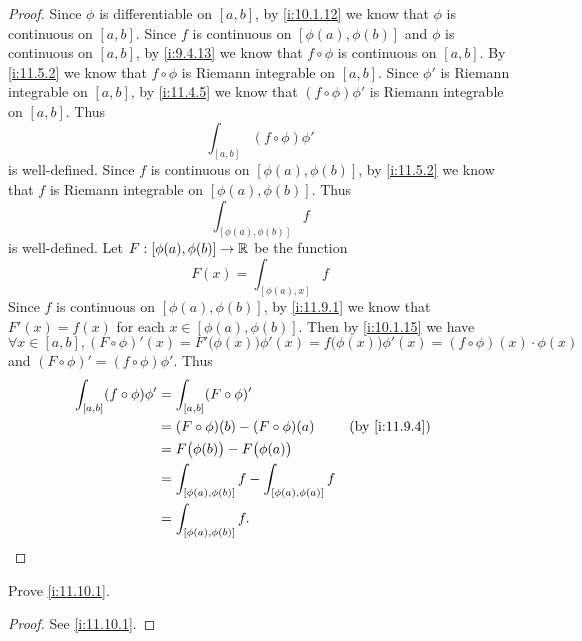 \begin{proof}
  Since \(\phi\) is differentiable on \([a, b]\), by \cref{i:10.1.12} we know that \(\phi\) is continuous on \([a, b]\).
  Since \(f\) is continuous on \([\phi(a), \phi(b)]\) and \(\phi\) is continuous on \([a, b]\), by \cref{i:9.4.13} we know that \(f \circ \phi\) is continuous on \([a, b]\).
  By \cref{i:11.5.2} we know that \(f \circ \phi\) is Riemann integrable on \([a, b]\).
  Since \(\phi'\) is Riemann integrable on \([a, b]\), by \cref{i:11.4.5} we know that \((f \circ \phi) \phi'\) is Riemann integrable on \([a, b]\).
  Thus
  \[
    \int_{[a, b]} (f \circ \phi) \phi'
  \]
  is well-defined.
  Since \(f\) is continuous on \([\phi(a), \phi(b)]\), by \cref{i:11.5.2} we know that \(f\) is Riemann integrable on \([\phi(a), \phi(b)]\).
  Thus
  \[
    \int_{[\phi(a), \phi(b)]} f
  \]
  is well-defined.
  Let \(F : [\phi(a), \phi(b)] \to \mathbb{R}\) be the function
  \[
    F(x) = \int_{[\phi(a), x]} f
  \]
  Since \(f\) is continuous on \([\phi(a), \phi(b)]\), by \cref{i:11.9.1} we know that \(F'(x) = f(x)\) for each \(x \in [\phi(a), \phi(b)]\).
  Then by \cref{i:10.1.15} we have
  \[
    \forall x \in [a, b], (F \circ \phi)'(x) = F'\big(\phi(x)\big) \phi'(x) = f\big(\phi(x)\big) \phi'(x) = (f \circ \phi)(x) \cdot \phi(x)
  \]
  and \((F \circ \phi)' = (f \circ \phi) \phi'\).
  Thus
  \begin{align*}
    \int_{[a, b]} (f \circ \phi) \phi' & = \int_{[a, b]} (F \circ \phi)'                                                \\
                                       & = (F \circ \phi)(b) - (F \circ \phi)(a)                     &  & \by{i:11.9.4} \\
                                       & = F\big(\phi(b)\big) - F\big(\phi(a)\big)                                      \\
                                       & = \int_{[\phi(a), \phi(b)]} f - \int_{[\phi(a), \phi(a)]} f                    \\
                                       & = \int_{[\phi(a), \phi(b)]} f.
  \end{align*}
\end{proof}

\exercisesection

\begin{ex}\label{i:ex:11.10.1}
  Prove \cref{i:11.10.1}.
\end{ex}

\begin{proof}
  See \cref{i:11.10.1}.
\end{proof}

